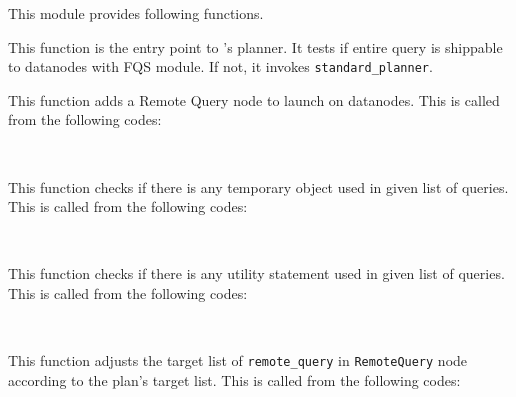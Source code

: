   This module provides following functions.
  
  
      This function is the entry point to \XC's planner.
      It tests if entire query is shippable to datanodes with FQS module.
      If not, it invokes \verb|standard_planner|.
  
  
      This function adds a Remote Query node to launch on datanodes.
      This is called from the following codes:
      
      \FuncRefHdr
		  \\ \hline
      \FuncRefTrailor
  
  
      This function checks if there is any temporary object used in given list of queries.
      This is called from the following codes:
      
      \FuncRefHdr
		  \\ \hline
      \FuncRefTrailor
  
  
      This function checks if there is any utility statement used in given list of queries.
      This is called from the following codes:
      
      \FuncRefHdr
      \\ \hline
      \FuncRefTrailor
  
  
      This function adjusts the target list of \verb|remote_query| in \verb|RemoteQuery| node
      according to the plan's target list.
      This is called from the following codes:
      
      \FuncRefHdr
		  \\
		  \\ \hline
      \FuncRefTrailor
      
